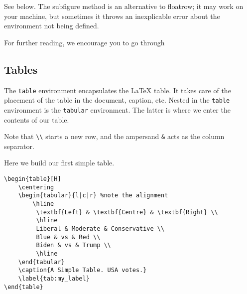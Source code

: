 \documentclass[12pt, letterpaper]{article}
\theoremstyle{remark}
\begin{document}
See below. The subfigure method is an alternative to floatrow; it may work on your machine, but sometimes it throws an inexplicable error about the environment not being defined. 

For further reading, we encourage you to go through \cite[Chapter 5]{figtable}

\begin{figure}[H]
    \centering
    \begin{floatrow}
    \end{floatrow}
    \begin{floatrow}
    \end{floatrow}
\end{figure}

\subsection{Tables}
The \verb!table! environment encapsulates the \LaTeX{} table. It takes care of the placement of the table in the document, caption, etc. Nested in the \verb!table! environment is the \verb!tabular! environment. The latter is where we enter the contents of our table.

Note that \verb!\\! starts a new row, and the ampersand \verb!&! acts as the column separator. 

Here we build our first simple table.
\begin{lstlisting}
\begin{table}[H]
    \centering
    \begin{tabular}{l|c|r} %note the alignment
        \hline
         \textbf{Left} & \textbf{Centre} & \textbf{Right} \\
         \hline 
         Liberal & Moderate & Conservative \\
         Blue & vs & Red \\
         Biden & vs & Trump \\
         \hline
    \end{tabular}
    \caption{A Simple Table. USA votes.}
    \label{tab:my_label}
\end{table}
\end{lstlisting}
\end{document}
